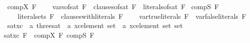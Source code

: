 {\isanewline
{}\isamarkupfalse%
\ {\isachardoublequoteopen}comp{\isacharunderscore}{\kern0pt}X\ F\ {\isasymequiv}\ \isanewline
\ \ vars{\isacharunderscore}{\kern0pt}of{\isacharunderscore}{\kern0pt}sat\ F\ {\isasymunion}\ clauses{\isacharunderscore}{\kern0pt}of{\isacharunderscore}{\kern0pt}sat\ F\ {\isasymunion}\ literals{\isacharunderscore}{\kern0pt}of{\isacharunderscore}{\kern0pt}sat\ F{\isachardoublequoteclose}\isanewline
{}\isamarkupfalse%
\ {\isachardoublequoteopen}comp{\isacharunderscore}{\kern0pt}S\ F\ {\isasymequiv}\ \isanewline
\ \ \ \ literal{\isacharunderscore}{\kern0pt}sets\ F\ {\isasymunion}\ clauses{\isacharunderscore}{\kern0pt}with{\isacharunderscore}{\kern0pt}literals\ F\ \isanewline
\ \ {\isasymunion}\ var{\isacharunderscore}{\kern0pt}true{\isacharunderscore}{\kern0pt}literals\ F\ {\isasymunion}\ var{\isacharunderscore}{\kern0pt}false{\isacharunderscore}{\kern0pt}literals\ F{\isachardoublequoteclose}\isanewline
\isanewline
{}\isamarkupfalse%
\ sat{\isacharunderscore}{\kern0pt}xc\ {\isacharcolon}{\kern0pt}{\isacharcolon}{\kern0pt}\ {\isachardoublequoteopen}{\isacharprime}{\kern0pt}a\ three{\isacharunderscore}{\kern0pt}sat\ {\isasymRightarrow}\ {\isacharprime}{\kern0pt}a\ xc{\isacharunderscore}{\kern0pt}element\ set\ {\isacharasterisk}{\kern0pt}\ {\isacharprime}{\kern0pt}a\ xc{\isacharunderscore}{\kern0pt}element\ set\ set{\isachardoublequoteclose}\ \ \isanewline
{\isachardoublequoteopen}sat{\isacharunderscore}{\kern0pt}xc\ F\ {\isacharequal}{\kern0pt}\ {\isacharparenleft}{\kern0pt}comp{\isacharunderscore}{\kern0pt}X\ F{\isacharcomma}{\kern0pt}\ comp{\isacharunderscore}{\kern0pt}S\ F{\isacharparenright}{\kern0pt}{\isachardoublequoteclose}
}


